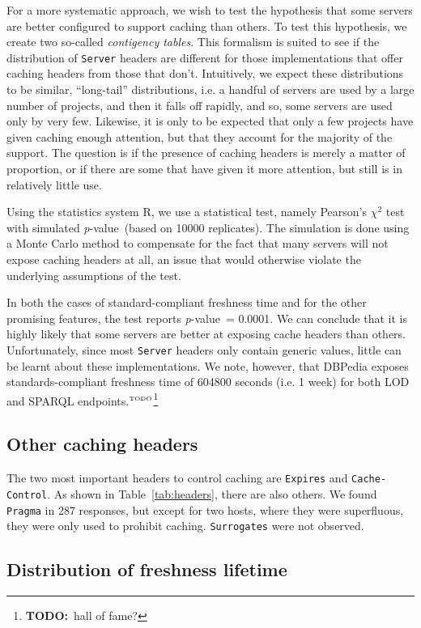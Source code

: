 \documentclass{llncs}
\newcommand{\pvalue}{\textit{p}-value\ }
\newcommand{\httph}[1]{\texttt{#1}}
\newcommand{\todo}[1]{\ensuremath{^{\textrm{\tiny{TODO}\normalsize}}}\footnote{\textbf{TODO:}~#1}}
\begin{document}
For a more systematic approach, we wish to test the hypothesis that
some servers are better configured to support caching than others. To
test this hypothesis, we create two so-called \emph{contigency
  tables}\cite{kn:bj}. This formalism is suited to see if the
distribution of  \httph{Server} headers are different for those implementations that
offer caching headers from those that don't. Intuitively, we expect
these distributions to be similar, ``long-tail'' distributions, i.e. a
handful of servers are used by a large number of projects, and then it
falls off rapidly, and so, some servers are used only by very
few. Likewise, it is only to be expected that only a few projects have
given caching enough attention, but that they account for the majority
of the support. The question is if the presence of caching headers is
merely a matter of proportion, or if there are some that have given it
more attention, but still is in relatively little use.

Using the statistics system R\cite{kn:r}, we use a statistical test,
namely Pearson's $\chi^2$ test with simulated \pvalue (based on 10000
replicates). The simulation is done using a Monte Carlo method to
compensate for the fact that many servers will not expose caching
headers at all, an issue that would otherwise violate the underlying
assumptions of the test.

In both the cases of standard-compliant freshness time and for the
other promising features, the test reports \pvalue = 0.0001. We can
conclude that it is highly likely that some servers are better at
exposing cache headers than others. Unfortunately, since most
\httph{Server} headers only contain generic values, little can be
learnt about these implementations. We note, however, that DBPedia
exposes standards-compliant freshness time of 604800 seconds (i.e. 1
week) for both LOD and SPARQL endpoints.\todo{hall of fame?}

\subsection{Other caching headers}

The two most important headers to control caching are \httph{Expires}
and \httph{Cache-Control}. As shown in Table~\ref{tab:headers}, there
are also others. We found \httph{Pragma} in 287 responses, but except
for two hosts, where they were superfluous, they were only used to
prohibit caching. \httph{Surrogates} were not observed.

\subsection{Distribution of freshness lifetime}
\end{document}
